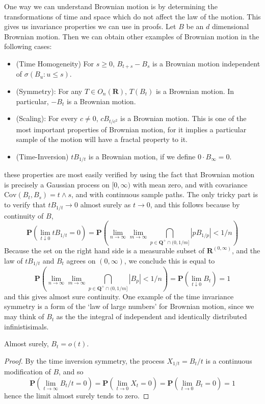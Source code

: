 One way we can understand Brownian motion is by determining the transformations of time and space which do not affect the law of the motion. This gives us invariance properties we can use in proofs. Let $B$ be an $d$ dimensional Brownian motion. Then we can obtain other examples of Brownian motion in the following cases:
%
\begin{itemize}
    \item (Time Homogeneity) For $s \geq 0$, $B_{t+s} - B_s$ is a Brownian motion independent of $\sigma(B_u: u \leq s)$.
    \item (Symmetry): For any $T \in O_n(\mathbf{R})$, $T(B_t)$ is a Brownian motion. In particular, $-B_t$ is a Brownian motion.
    \item (Scaling): For every $c \neq 0$, $cB_{t/c^2}$ is a Brownian motion. This is one of the most important properties of Brownian motion, for it implies a particular sample of the motion will have a fractal property to it.
    \item (Time-Inversion) $tB_{1/t}$ is a Brownian motion, if we define $0 \cdot B_\infty = 0$.
\end{itemize}
%
these properties are most easily verified by using the fact that Brownian motion is precisely a Gaussian process on $[0,\infty)$ with mean zero, and with covariance $\text{Cov}(B_t, B_s) = t \wedge s$, and with continuous sample paths. The only tricky part is to verify that $tB_{1/t} \to 0$ almost surely as $t \to 0$, and this follows because by continuity of $B$,
%
\[ \mathbf{P} \left( \lim_{t \downarrow 0} tB_{1/t} = 0 \right) = \mathbf{P} \left( \lim_{n \to \infty} \lim_{m \to \infty} \bigcap_{p \in \mathbf{Q}^+ \cap (0,1/m]} |pB_{1/p}| < 1/n \right) \]
%
Because the set on the right hand side is a measurable subset of $\mathbf{R}^{(0,\infty)}$, and the law of $tB_{1/t}$ and $B_t$ agrees on $(0,\infty)$, we conclude this is equal to
%
\[ \mathbf{P} \left( \lim_{n \to \infty} \lim_{m \to \infty} \bigcap_{p \in \mathbf{Q}^+ \cap (0,1/m]} |B_p| < 1/n \right) = \mathbf{P} \left( \lim_{t \downarrow 0} B_t \right) = 1 \]
%
and this gives almost sure continuity. One example of the time invariance symmetry is a form of the `law of large numbers' for Brownian motion, since we may think of $B_t$ as the the integral of independent and identically distributed infinistisimals.

\begin{theorem}
    Almost surely, $B_t = o(t)$.
\end{theorem}
\begin{proof}
    By the time inversion symmetry, the process $X_{1/t} = B_t/t$ is a continuous modification of $B$, and so
    \[ \mathbf{P} \left( \lim_{t \to \infty} B_t/t = 0 \right) = \mathbf{P} \left( \lim_{t \to 0} X_t = 0 \right) = \mathbf{P} \left( \lim_{t \to 0} B_t = 0 \right) = 1 \]
    hence the limit almost surely tends to zero.
\end{proof}

